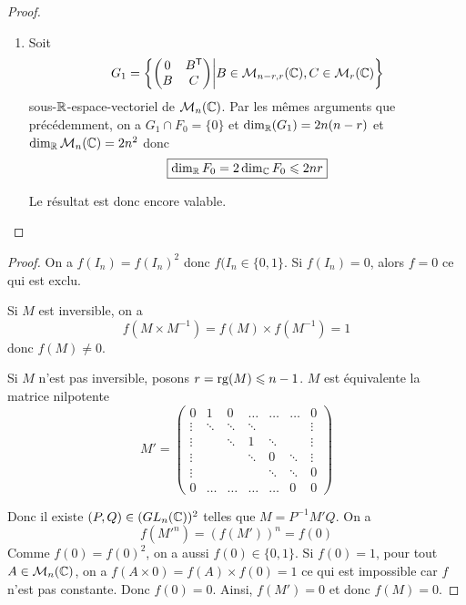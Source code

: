 \documentclass[12pt]{article}
\begin{document}
\begin{proof}
\begin{enumerate}
        \item Soit 
        \begin{equation}
            G_{1}=\left\lbrace\begin{pmatrix}
                0 & B^{\mathsf{T}}\\
                B & C
            \end{pmatrix}\middle| B\in\mathcal{M}_{n-r,r}(\mathbb{C}),C\in\mathcal{M}_{r}(\mathbb{C})\right\rbrace
        \end{equation}
        sous-$\mathbb{R}$-espace-vectoriel de $\mathcal{M}_{n}(\mathbb{C})$. Par les mêmes arguments que précédemment, on a $G_{1}\cap F_{0}=\lbrace0\rbrace$ et $\dim_{\mathbb{R}}(G_{1})=2n(n-r)$ et $\dim_{\mathbb{R}}\mathcal{M}_{n}(\mathbb{C})=2n^{2}$ donc 
        \begin{equation}
            \boxed{\dim_{\mathbb{R}}F_{0}=2\dim_{\mathbb{C}}F_{0}\leqslant 2nr}
        \end{equation}

        Le résultat est donc encore valable.
    \end{enumerate}
\end{proof}

\begin{proof}
    On a $f(I_{n})=f(I_{n})^{2}$ donc $f(I_{n}\in\lbrace0,1\rbrace$. Si $f(I_{n})=0$, alors $f=0$ ce qui est exclu.

    Si $M$ est inversible, on a 
    \begin{equation}
        f(M\times M^{-1})=f(M)\times f(M^{-1})=1
    \end{equation}
    donc $f(M)\neq0$.

    Si $M$ n'est pas inversible, posons $r=\operatorname{rg}(M)\leqslant n-1$. $M$ est équivalente la matrice nilpotente
    \begin{equation}
        M'=
        \begin{pmatrix}
            0 & 1 & 0 &\dots & \dots&\dots & 0\\
            \vdots & \ddots & \ddots & \ddots& & &\vdots\\
            \vdots & &\ddots & 1 & \ddots &&\vdots\\
            \vdots & && \ddots & 0 &\ddots &\vdots\\
            \vdots & & & &\ddots & \ddots & 0\\
            0 &\dots & \dots & \dots & \dots &0&0
        \end{pmatrix}
    \end{equation}

    Donc il existe $(P,Q)\in (GL_{n}(\mathbb{C}))^{2}$ telles que $M=P^{-1}M'Q$. On a
    \begin{equation}
        f(M'^{n})=\left(f(M')\right)^{n}=f(0)
    \end{equation}
    Comme $f(0)=f(0)^{2}$, on a aussi $f(0)\in\lbrace0,1\rbrace$. Si $f(0)=1$, pour tout $A\in\mathcal{M}_{n}(\mathbb{C})$, on a $f(A\times 0)=f(A)\times f(0)=1$ ce qui est impossible car $f$ n'est pas constante. Donc $f(0)=0$. Ainsi, $f(M')=0$ et donc $f(M)=0$.
\end{proof}
\end{document}
